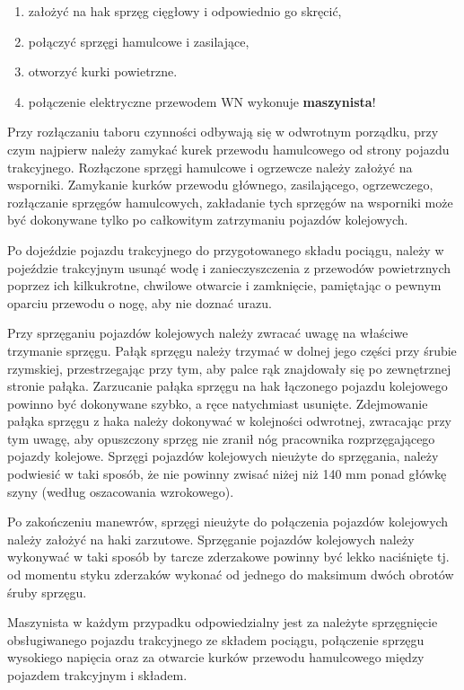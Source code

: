 \begin{enumerate}
	\item założyć na hak sprzęg cięgłowy i odpowiednio go skręcić, 
	\item połączyć sprzęgi hamulcowe i zasilające, 
	\item otworzyć kurki powietrzne.
	\item połączenie elektryczne przewodem WN wykonuje \textbf{maszynista}!
\end{enumerate}
Przy rozłączaniu taboru czynności odbywają się w odwrotnym porządku, przy czym najpierw należy zamykać kurek przewodu hamulcowego od strony pojazdu trakcyjnego. Rozłączone sprzęgi hamulcowe i ogrzewcze należy założyć na wsporniki. Zamykanie kurków przewodu głównego, zasilającego, ogrzewczego, rozłączanie sprzęgów hamulcowych, zakładanie tych sprzęgów na wsporniki może być dokonywane tylko po całkowitym zatrzymaniu pojazdów kolejowych. 

Po dojeździe pojazdu trakcyjnego do przygotowanego składu pociągu, należy w pojeździe trakcyjnym usunąć wodę i zanieczyszczenia z przewodów powietrznych poprzez ich kilkukrotne, chwilowe otwarcie i zamknięcie, pamiętając o pewnym oparciu przewodu o nogę, aby nie doznać urazu.

Przy sprzęganiu pojazdów kolejowych należy zwracać uwagę na właściwe trzymanie sprzęgu. Pałąk sprzęgu należy trzymać w dolnej jego części przy śrubie rzymskiej, przestrzegając przy tym, aby palce rąk znajdowały się po zewnętrznej stronie pałąka. Zarzucanie pałąka sprzęgu na hak łączonego pojazdu kolejowego powinno być dokonywane szybko, a ręce natychmiast usunięte. Zdejmowanie pałąka sprzęgu z haka należy dokonywać w kolejności odwrotnej, zwracając przy tym uwagę, aby opuszczony sprzęg nie zranił nóg pracownika rozprzęgającego pojazdy kolejowe. Sprzęgi pojazdów kolejowych nieużyte do sprzęgania, należy podwiesić w taki sposób, że nie powinny zwisać niżej niż 140 mm ponad główkę szyny (według oszacowania wzrokowego). 

Po zakończeniu manewrów, sprzęgi nieużyte do połączenia pojazdów kolejowych należy założyć na haki zarzutowe. Sprzęganie pojazdów kolejowych należy wykonywać w taki sposób by tarcze zderzakowe powinny być lekko naciśnięte tj. od momentu styku zderzaków wykonać od jednego do maksimum dwóch obrotów śruby sprzęgu. 

Maszynista w każdym przypadku odpowiedzialny jest za należyte sprzęgnięcie obsługiwanego pojazdu trakcyjnego ze składem pociągu, połączenie sprzęgu wysokiego napięcia oraz za otwarcie kurków przewodu hamulcowego między pojazdem trakcyjnym i składem. 

